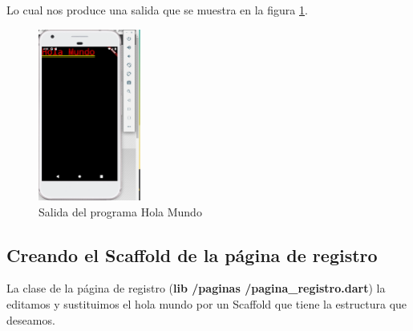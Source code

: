 Lo cual nos produce una salida que se muestra en la figura \ref{cap1:005}.

\begin{figure}[htb]
\centering
\includegraphics[width=0.3\textwidth]{capitulo1/holaMundo.png}
\caption{Salida del programa Hola Mundo}
\label{cap1:005}
\end{figure} 

\subsection{Creando el Scaffold de la página de registro}

La clase de la página de registro (\textbf{lib /paginas /pagina\_registro.dart}) la editamos y sustituimos el hola mundo por un Scaffold que tiene la estructura que deseamos. 


